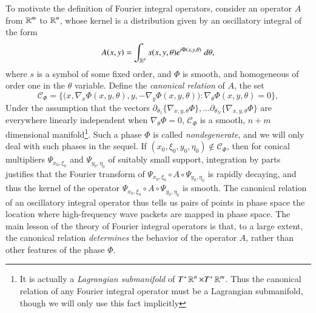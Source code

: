 To motivate the definition of Fourier integral operators, consider an operator $A$ from $\operatorname{\mathbb{R}}^m$ to $\operatorname{\mathbb{R}}^n$, whose kernel is a distribution given by an oscillatory integral of the form
%
\begin{equation}
  A(x,y) = \int_{\operatorname{\mathbb{R}}^p} s(x,y,\theta) e^{i \Phi(x,y,\theta)}\; d\theta,
\end{equation}
%
where $s$ is a symbol of some fixed order, and $\Phi$ is smooth, and homogeneous of order one in the $\theta$ variable. Define the \emph{canonical relation} of $A$, the set
%
\begin{equation}
  \mathcal{C}_\Phi = \Big\{ \big(x, \nabla_x \Phi(x,y,\theta) ,y, -\nabla_y \Phi(x,y,\theta) \big) : \nabla_\theta \Phi(x,y,\theta) = 0 \Big\},
\end{equation}
%
Under the assumption that the vectors $\partial_{\theta_1} \{ \nabla_{x,y,\theta} \Phi \}, \dots \partial_{\theta_N} \{ \nabla_{x,y,\theta} \Phi \}$ are everywhere linearly independent when $\nabla_\theta \Phi = 0$, $\mathcal{C}_\Phi$ is a smooth, $n + m$ dimensional manifold\footnote{It is actually a \emph{Lagrangian submanifold} of $T^* \operatorname{\mathbb{R}}^n \times T^* \operatorname{\mathbb{R}}^m$. Thus the canonical relation of any Fourier integral operator must be a Lagrangian submanifold, though we will only use this fact implicitly}. Such a phase $\Phi$ is called \emph{nondegenerate}, and we will only deal with such phases in the sequel. If $(x_0,\xi_0,y_0,\eta_0) \not \in \mathcal{C}_\Phi$, then for conical multipliers $\Psi_{x_0,\xi_0}$ and $\Psi_{y_0,\eta_0}$ of suitably small support, integration by parts justifies that the Fourier transform of $\Psi_{x_0,\xi_0} \circ A \circ \Psi_{y_0,\eta_0}$ is rapidly decaying, and thus the kernel of the operator $\Psi_{x_0,\xi_0} \circ A \circ \Psi_{y_0,\eta_0}$ is smooth. The canonical relation of an oscillatory integral operator thus tells us pairs of points in phase space the location where high-frequency wave packets are mapped in phase space. The main lesson of the theory of Fourier integral operators is that, to a large extent, the canonical relation \emph{determines} the behavior of the operator $A$, rather than other features of the phase $\Phi$.


